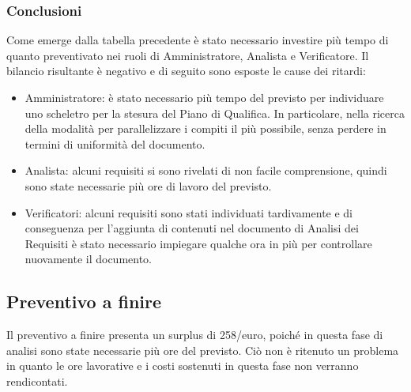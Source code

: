 \subsubsection{Conclusioni}
Come emerge dalla tabella precedente è stato necessario investire più tempo di quanto preventivato
nei ruoli di Amministratore, Analista e Verificatore.
Il bilancio risultante è negativo e di seguito sono esposte le cause dei ritardi:
\begin{itemize}
	\item Amministratore: è stato necessario più tempo del previsto per individuare uno scheletro per la stesura del Piano di Qualifica. In particolare,
	nella ricerca della modalità per parallelizzare i compiti il più possibile, senza perdere in termini di uniformità del documento.
	\item Analista: alcuni requisiti si sono rivelati di non facile comprensione, quindi sono state necessarie 
	più ore di lavoro del previsto.
	\item Verificatori: alcuni requisiti sono stati individuati tardivamente e di conseguenza per
	l’aggiunta di contenuti nel documento di Analisi dei Requisiti è stato necessario impiegare
	qualche ora in più per controllare nuovamente il documento.
\end{itemize}
\subsection{Preventivo a finire}
Il preventivo a finire presenta un surplus di 258/euro, poiché in questa fase di analisi sono state necessarie più ore del previsto.
Ciò non è ritenuto un problema in quanto le ore lavorative e i costi sostenuti in questa fase non verranno rendicontati.